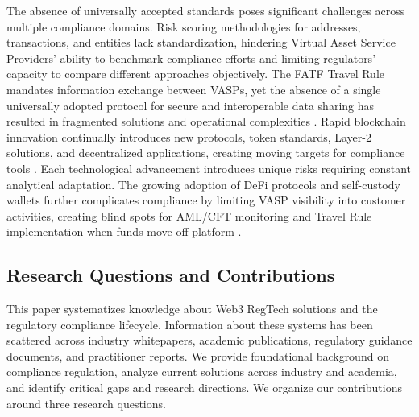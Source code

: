 \documentclass[conference,compsoc]{IEEEtran}
\begin{document}
The absence of universally accepted standards poses significant challenges across multiple compliance domains. Risk scoring methodologies for addresses, transactions, and entities lack standardization, hindering Virtual Asset Service Providers' ability to benchmark compliance efforts and limiting regulators' capacity to compare different approaches objectively. The FATF Travel Rule mandates information exchange between VASPs, yet the absence of a single universally adopted protocol for secure and interoperable data sharing has resulted in fragmented solutions and operational complexities \cite{force2021updatedguidanceriskbased,pocher2022privacytransparencycbdcs}. Rapid blockchain innovation continually introduces new protocols, token standards, Layer-2 solutions, and decentralized applications, creating moving targets for compliance tools \cite{mohammedabdul2024navigatingblockchainstwin,xu2024exploringblockchaintechnology,bankforinternationalsettlementsbis2022futuremonetarysystem}. Each technological advancement introduces unique risks requiring constant analytical adaptation. The growing adoption of DeFi protocols and self-custody wallets further complicates compliance by limiting VASP visibility into customer activities, creating blind spots for AML/CFT monitoring and Travel Rule implementation when funds move off-platform \cite{harvey2021defifuturefinance,salami2021challengesapproachesregulating}.

\subsection{Research Questions and Contributions}

This paper systematizes knowledge about Web3 RegTech solutions and the regulatory compliance lifecycle. Information about these systems has been scattered across industry whitepapers, academic publications, regulatory guidance documents, and practitioner reports. We provide foundational background on compliance regulation, analyze current solutions across industry and academia, and identify critical gaps and research directions. We organize our contributions around three research questions.
\end{document}
